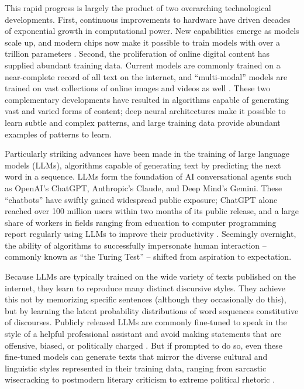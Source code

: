 \documentclass{article} %
\begin{document}
This rapid progress is largely the product of two overarching
technological developments. First, continuous improvements to hardware
have driven decades of exponential growth in computational power. New
capabilities emerge as models scale up, and modern chips now make it
possible to train models with over a trillion parameters \parencite{Kaplan2020-lo}.
Second, the proliferation of online digital content has supplied
abundant training data. Current models are commonly trained on a
near-complete record of all text on the internet, and ``multi-modal''
models are trained on vast collections of online images and videos as
well \parencite{Brown2020-nh}. These two complementary developments have
resulted in algorithms capable of generating vast and varied forms of
content; deep neural architectures make it possible to learn subtle and
complex patterns, and large training data provide abundant examples of
patterns to learn.

Particularly striking advances have been made in the training of large
language models (LLMs), algorithms capable of generating text by
predicting the next word in a sequence. LLMs form the foundation of AI
conversational agents such as OpenAI's ChatGPT, Anthropic's Claude, and
Deep Mind's Gemini. These ``chatbots'' have swiftly gained widespread
public exposure; ChatGPT alone reached over 100 million users within two
months of its public release, and a large share of workers in fields
ranging from education to computer programming report regularly using
LLMs to improve their productivity
\parencite{DellAcqua2023-fo, Mollick2023-wy}. Seemingly overnight, the ability of
algorithms to successfully impersonate human interaction -- commonly
known as ``the Turing Test'' \parencite{Turing1950-in} -- shifted
from aspiration to expectation.

Because LLMs are typically trained on the wide variety of texts
published on the internet, they learn to reproduce many distinct
discursive styles. They achieve this not by memorizing specific
sentences (although they occasionally do this), but by learning the
latent probability distributions of word sequences constitutive of
discourses. Publicly released LLMs are commonly fine-tuned to speak in
the style of a helpful professional assistant and avoid making
statements that are offensive, biased, or politically charged
\parencite{Ouyang2022-xw}. But if
prompted to do so, even these fine-tuned models can generate texts that
mirror the diverse cultural and linguistic styles represented in their
training data, ranging from sarcastic wisecracking to postmodern
literary criticism to extreme political rhetoric \parencite{Argyle2023-ii, Kim2023-ji, Park2022-py}.
\end{document}
